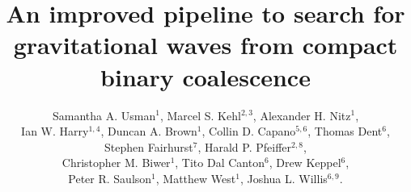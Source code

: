 \documentclass[12pt]{iopart} \usepackage{graphicx,amssymb}
\begin{document}
\title[An improved pipeline for CBC GW searches]{An improved pipeline to search for gravitational waves from compact
binary coalescence}

\author{Samantha A. Usman$^1$,
        Marcel S. Kehl$^{2,3}$,
        Alexander H. Nitz$^1$, \\
        Ian W. Harry$^{1,4}$,
        Duncan A. Brown$^1$,
        Collin D. Capano$^{5,6}$,
        Thomas Dent$^6$,
        Stephen Fairhurst$^7$, 
        Harald P. Pfeiffer$^{2,8}$, \\
        Christopher M. Biwer$^1$, 
        Tito Dal Canton$^6$,
        Drew Keppel$^6$, \\
        Peter R. Saulson$^1$,
        Matthew West$^1$, 
        Joshua L. Willis$^{6,9}$.}

\address{$^{1}$ Department of Physics,
         Syracuse University, Syracuse, NY 13244, USA}

\address{$^{2}$ Canadian Institute for Theoretical Astrophysics,
         University~of~Toronto, Toronto, Ontario M5S 3H8, Canada}

\address{$^3$ Max-Planck-Institut f{\"u}r Radioastronomie, Auf dem H{\"u}gel 69,  53121 Bonn, Germany}

\address{$^4$ Max-Planck-Institut f{\"u}r Gravitationsphysik,
         Albert-Einstein-Institut, Am M\"uhlenberg 1,
         D-14476 Golm, Germany}

\address{$^5$ Maryland Center for Fundamental
         Physics \& Joint Space-Science Institute,
         Department of Physics,
         University of Maryland, College Park, MD 20742, USA}

\address{$^6$ Max-Planck-Institut f{\"u}r Gravitationsphysik,
         Albert-Einstein-Institut, D-30167 Hannover, Germany}

\address{$^7$ Cardiff University, Cardiff CF24 3AA, United Kingdom}

\address{$^8$ Canadian Institute for Advanced
  Research, 180 Dundas St.~West, Toronto, ON M5G 1Z8, Canada}

\address{$^9$ Abilene Christian University, Abilene, TX 79601, USA}

\end{document}

